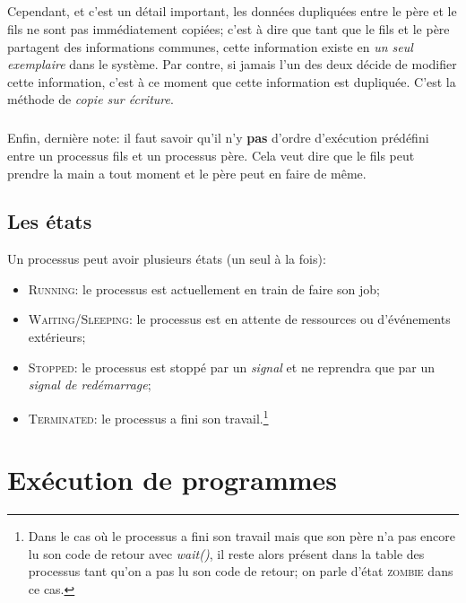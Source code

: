 \documentclass{report}
\begin{document}
\paragraph{}
Cependant, et c'est un détail important, les données dupliquées entre le père et le fils ne sont pas immédiatement copiées; c'est à dire que tant que le fils et le père partagent des informations communes, cette information existe en \emph{un seul exemplaire} dans le système. Par contre, si jamais l'un des deux décide de modifier cette information, c'est à ce moment que cette information est dupliquée. C'est la méthode de \emph{copie sur écriture}.
\paragraph{}
Enfin, dernière note: il faut savoir qu'il n'y \textbf{pas} d'ordre d'exécution prédéfini entre un processus fils et un processus père. Cela veut dire que le fils peut prendre la main a tout moment et le père peut en faire de même.

\section{Les états}
Un processus peut avoir plusieurs états (un seul à la fois):
\begin{itemize}
\item \textsc{Running}: le processus est actuellement en train de faire son job;
\item \textsc{Waiting/Sleeping}: le processus est en attente de ressources ou d'événements extérieurs;
\item \textsc{Stopped}: le processus est stoppé par un \emph{signal} et ne reprendra que par un \emph{signal de redémarrage};
\item \textsc{Terminated}: le processus a fini son travail.\footnote{Dans le cas où le processus a fini son travail mais que son père n'a pas encore lu son code de retour avec \emph{wait()}, il reste alors présent dans la table des processus tant qu'on a pas lu son code de retour; on parle d'état \textsc{zombie} dans ce cas.}
\end{itemize}




\chapter{Exécution de programmes}
\end{document}
